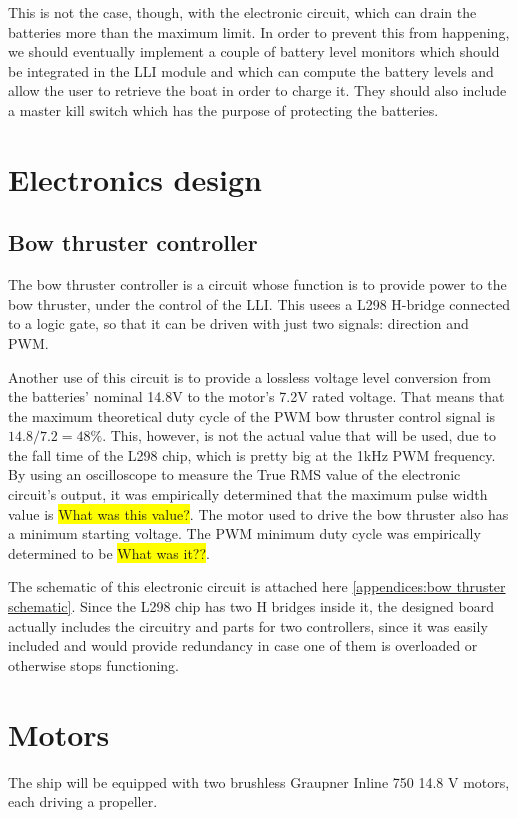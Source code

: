 	This is not the case, though, with the electronic circuit, which can drain the batteries more than the maximum limit. In order to prevent this from happening, we should eventually implement a couple of battery level monitors which should be integrated in the \ac{LLI} module and which can compute the battery levels and allow the user to retrieve the boat in order to charge it. They should also include a master kill switch which has the purpose of protecting the batteries.

\section{Electronics design}

	\subsection{Bow thruster controller}
	\label{subsec:bow thruster controller}
	
	The bow thruster controller is a circuit whose function is to provide power to the bow thruster, under the control of the \ac{LLI}. This usees a L298 H-bridge connected to a logic gate, so that it can be driven with just two signals: direction and \ac{PWM}.
	
	Another use of this circuit is to provide a lossless voltage level conversion from the batteries' nominal 14.8V to the motor's 7.2V rated voltage. That means that the maximum theoretical duty cycle of the PWM bow thruster control signal is $ 14.8 / 7.2 = 48 \% $. This, however, is not the actual value that will be used, due to the fall time of the L298 chip, which is pretty big at the 1kHz PWM frequency. By using an oscilloscope to measure the True RMS value of the electronic circuit's output, it was empirically determined that the maximum pulse width value is \colorbox{yellow}{What was this value?}. 
	The motor used to drive the bow thruster also has a minimum starting voltage. The PWM minimum duty cycle was empirically determined to be \colorbox{yellow}{What was it??}.
	
	The schematic of this electronic circuit is attached here \ref{appendices:bow thruster schematic}. Since the L298 chip has two H bridges inside it, the designed board actually includes the circuitry and parts for two controllers, since it was easily included and would provide redundancy in case one of them is overloaded or otherwise stops functioning.
	
\section{Motors}

The ship will be equipped with two brushless Graupner Inline 750 14.8 V motors, each driving a propeller. 
